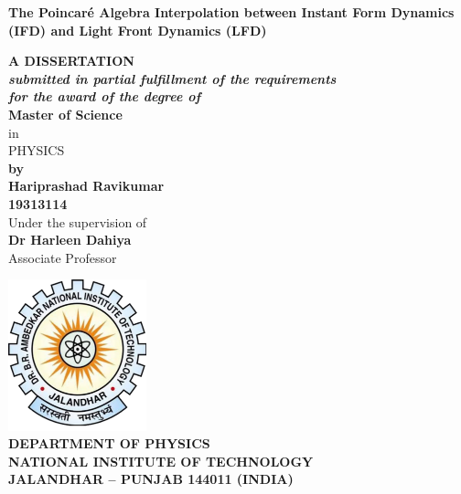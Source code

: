 \documentclass[12pt,a4paper]{report}
\begin{document}
	\begin{center}
		\begin{large}
			\textbf{The Poincaré Algebra Interpolation between Instant Form Dynamics (IFD) and Light Front Dynamics (LFD)}\\
		\end{large}
		\vspace*{35pt}
		
		\textbf{A DISSERTATION\\
			\it{submitted in partial fulfillment of the requirements \\for the award of the degree of}\\}
		\vspace{40pt}
		\textbf{Master of Science\\}
		in\\
		\vspace{10pt}
		{PHYSICS}\\
		\vspace{10pt}
		\textbf{by\\
			\vspace{20pt}
			Hariprashad Ravikumar\\19313114}\\
		\vspace{10pt}
		Under the supervision of\\
		\textbf{Dr Harleen Dahiya}\\
		Associate Professor
		
		
	   \vspace{20pt}
		\includegraphics[width=0.3\textwidth]{./logoo.png} \\
		\vspace{30pt}
		\textbf{DEPARTMENT OF PHYSICS\\
			NATIONAL INSTITUTE OF TECHNOLOGY\\
			JALANDHAR – PUNJAB 144011 (INDIA)\\
		}
	\end{center}
\clearpage
\newcommand{\RN}[1]{%
	\textup{\uppercase\expandafter{\romannumeral#1}}%
}
\end{document}
